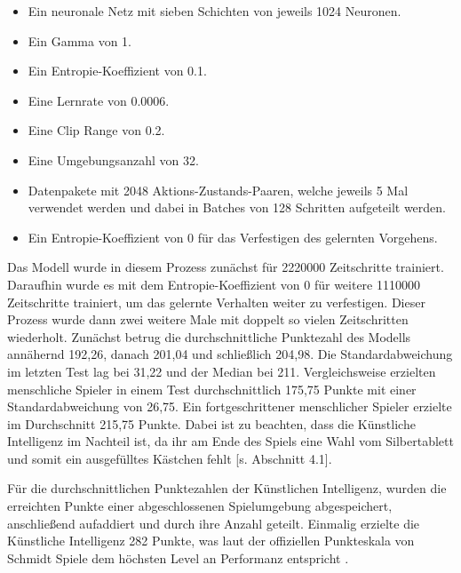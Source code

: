 \begin{itemize} 
\item Ein neuronale Netz mit sieben Schichten von jeweils 1024 Neuronen. 

\item Ein Gamma von 1. 

\item Ein Entropie-Koeffizient von 0.1. 

\item Eine Lernrate von 0.0006. 

\item Eine Clip Range von 0.2. 

\item Eine Umgebungsanzahl von 32. 

\item Datenpakete mit 2048 Aktions-Zustands-Paaren, welche jeweils 5 Mal verwendet werden und dabei in Batches von 128 Schritten aufgeteilt werden. 

\item Ein Entropie-Koeffizient von 0 für das Verfestigen des gelernten Vorgehens. 
\end{itemize} 

Das Modell wurde in diesem Prozess zunächst für 2220000 Zeitschritte trainiert. Daraufhin wurde es mit dem Entropie-Koeffizient von 0 für weitere 1110000 Zeitschritte trainiert, um das gelernte Verhalten weiter zu verfestigen. Dieser Prozess wurde dann zwei weitere Male mit doppelt so vielen Zeitschritten wiederholt. Zunächst betrug die durchschnittliche Punktezahl des Modells annähernd 192,26, danach 201,04 und schließlich 204,98. Die Standardabweichung im letzten Test lag bei 31,22 und der Median bei 211. Vergleichsweise erzielten menschliche Spieler in einem Test durchschnittlich 175,75 Punkte mit einer Standardabweichung von 26,75. Ein fortgeschrittener menschlicher Spieler erzielte im Durchschnitt 215,75 Punkte. Dabei ist zu beachten, dass die Künstliche Intelligenz im Nachteil ist, da ihr am Ende des Spiels eine Wahl vom Silbertablett und somit ein ausgefülltes Kästchen fehlt [s. Abschnitt 4.1].

Für die durchschnittlichen Punktezahlen der Künstlichen Intelligenz, wurden die erreichten Punkte einer abgeschlossenen Spielumgebung abgespeichert, anschließend aufaddiert und durch ihre Anzahl geteilt. Einmalig erzielte die Künstliche Intelligenz 282 Punkte, was laut der offiziellen Punkteskala von Schmidt Spiele dem höchsten Level an Performanz entspricht \cite{schmidtspiele_ganzschonclever}.
